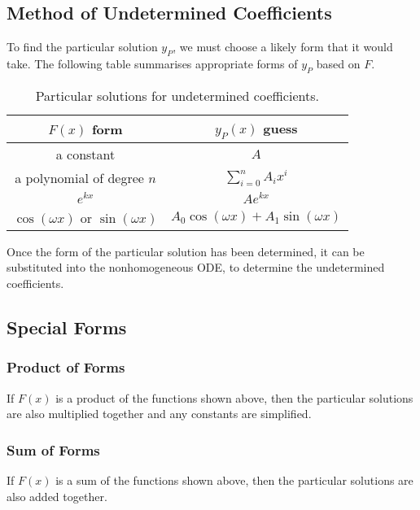 \documentclass{article}
\begin{document}
\subsection{Method of Undetermined Coefficients}
To find the particular solution \(y_P\), we must choose a likely form
that it would take. The following table summarises appropriate forms of
\(y_P\) based on \(F\).
\begin{table}[H]
    \centering
    \begin{tabular}{c c}
        \toprule
        \(F\left( x \right)\) form                                             & \(y_P\left( x \right)\) guess                                             \\
        \midrule
        a constant                                                             & \(A\)                                                                     \\
        a polynomial of degree \(n\)                                           & \(\displaystyle \sum_{i = 0}^n A_i x^i\)                                  \\
        \(e^{kx}\)                                                             & \(A e^{kx}\)                                                              \\
        \(\cos{\left( \omega x \right)}\) or \(\sin{\left( \omega x \right)}\) & \(A_0 \cos{\left( \omega x \right)} + A_1 \sin{\left( \omega x \right)}\) \\
        \bottomrule
    \end{tabular}
    \caption{Particular solutions for undetermined coefficients.}
\end{table}
Once the form of the particular solution has been determined, it can be
substituted into the nonhomogeneous ODE, to determine the undetermined
coefficients.
\subsection{Special Forms}
\subsubsection{Product of Forms}
If \(F\left( x \right)\) is a product of the functions shown above,
then the particular solutions are also multiplied together and any
constants are simplified.
\subsubsection{Sum of Forms}
If \(F\left( x \right)\) is a sum of the functions shown above, then
the particular solutions are also added together.
\end{document}
